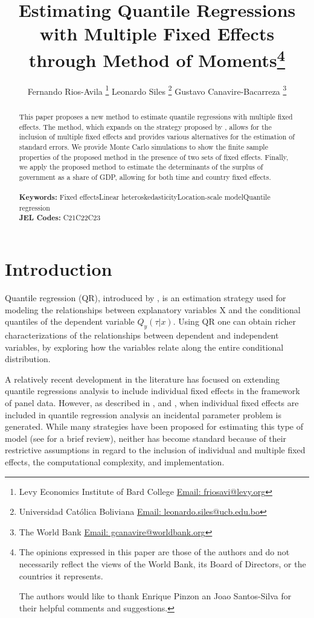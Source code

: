 \documentclass[
  12pt,
  oneside]{article}
\title{\textbf{\Large Estimating Quantile Regressions with Multiple
Fixed Effects through Method of Moments}\thanks{The opinions expressed
in this paper are those of the authors and do not necessarily reflect
the views of the World Bank, its Board of Directors, or the countries it
represents.

The authors would like to thank Enrique Pinzon an Joao Santos-Silva for
their helpful comments and suggestions.}}
\author{
Fernando Rios-Avila
\thanks{
      Levy Economics Institute of Bard
College      \href{mailto:friosavi@levy.org}{Email: friosavi@levy.org}
  } \hspace{0.25 cm} 
Leonardo Siles
\thanks{
      Universidad Católica
Boliviana      \href{mailto:leonardo.siles@ucb.edu.bo}{Email: leonardo.siles@ucb.edu.bo}
  } \hspace{0.25 cm} 
Gustavo Canavire-Bacarreza
\thanks{
      The World
Bank      \href{mailto:gcanavire@worldbank.org}{Email: gcanavire@worldbank.org}
  }}
\begin{document}
\maketitle
\begin{abstract}

    This paper proposes a new method to estimate quantile regressions
with multiple fixed effects. The method, which expands on the strategy
proposed by \citet{mss2019}, allows for the inclusion of multiple fixed
effects and provides various alternatives for the estimation of standard
errors. We provide Monte Carlo simulations to show the finite sample
properties of the proposed method in the presence of two sets of fixed
effects. Finally, we apply the proposed method to estimate the
determinants of the surplus of government as a share of GDP, allowing
for both time and country fixed effects. \\ \\
    
    \noindent \textbf{Keywords:} Fixed effectsLinear
heteroskedasticityLocation-scale modelQuantile regression \\
    \noindent \textbf{JEL Codes:} C21C22C23  
    
    \end{abstract}
    
    \newpage

\newpage{}

\section{Introduction}\label{introduction}

Quantile regression (QR), introduced by \citet{koenkerbasset1978}, is an
estimation strategy used for modeling the relationships between
explanatory variables X and the conditional quantiles of the dependent
variable \(Q_y (\tau|x)\). Using QR one can obtain richer
characterizations of the relationships between dependent and independent
variables, by exploring how the variables relate along the entire
conditional distribution.

A relatively recent development in the literature has focused on
extending quantile regressions analysis to include individual fixed
effects in the framework of panel data. However, as described in
\citet{neymanscott1948}, and \citet{lancaster2000}, when individual
fixed effects are included in quantile regression analysis an incidental
parameter problem is generated. While many strategies have been proposed
for estimating this type of model (see \citet{galvao2017quantile} for a
brief review), neither has become standard because of their restrictive
assumptions in regard to the inclusion of individual and multiple fixed
effects, the computational complexity, and implementation.
\end{document}
